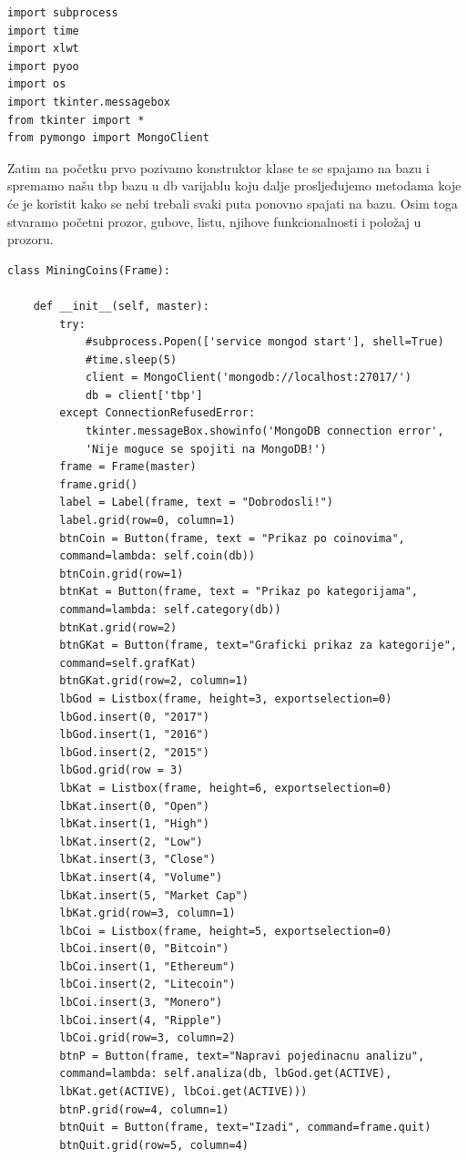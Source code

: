 \documentclass[a4paper,12pt]{foi}
\begin{document}
\lstset{commentstyle=\textit,language=python}
\begin{lstlisting}[frame=tb]
import subprocess
import time
import xlwt
import pyoo
import os
import tkinter.messagebox
from tkinter import *
from pymongo import MongoClient
\end{lstlisting}


Zatim na početku prvo pozivamo konstruktor klase te se spajamo na bazu i spremamo našu tbp bazu u db varijablu koju dalje prosljeđujemo metodama koje će je koristit kako se nebi trebali svaki puta ponovno spajati na bazu. Osim toga stvaramo početni prozor, gubove, listu, njihove funkcionalnosti i položaj u prozoru.
 
 
\lstset{commentstyle=\textit,language=python}
\begin{lstlisting}[frame=tb]
class MiningCoins(Frame):

    def __init__(self, master):
        try:
            #subprocess.Popen(['service mongod start'], shell=True)
            #time.sleep(5)
            client = MongoClient('mongodb://localhost:27017/')
            db = client['tbp']
        except ConnectionRefusedError:
            tkinter.messageBox.showinfo('MongoDB connection error', 
            'Nije moguce se spojiti na MongoDB!')
        frame = Frame(master)
        frame.grid()
        label = Label(frame, text = "Dobrodosli!")
        label.grid(row=0, column=1)
        btnCoin = Button(frame, text = "Prikaz po coinovima", 
        command=lambda: self.coin(db))
        btnCoin.grid(row=1)
        btnKat = Button(frame, text = "Prikaz po kategorijama", 
        command=lambda: self.category(db))
        btnKat.grid(row=2)
        btnGKat = Button(frame, text="Graficki prikaz za kategorije", 
        command=self.grafKat)
        btnGKat.grid(row=2, column=1)
        lbGod = Listbox(frame, height=3, exportselection=0)
        lbGod.insert(0, "2017")
        lbGod.insert(1, "2016")
        lbGod.insert(2, "2015")
        lbGod.grid(row = 3)
        lbKat = Listbox(frame, height=6, exportselection=0)
        lbKat.insert(0, "Open")
        lbKat.insert(1, "High")
        lbKat.insert(2, "Low")
        lbKat.insert(3, "Close")
        lbKat.insert(4, "Volume")
        lbKat.insert(5, "Market Cap")
        lbKat.grid(row=3, column=1)
        lbCoi = Listbox(frame, height=5, exportselection=0)
        lbCoi.insert(0, "Bitcoin")
        lbCoi.insert(1, "Ethereum")
        lbCoi.insert(2, "Litecoin")
        lbCoi.insert(3, "Monero")
        lbCoi.insert(4, "Ripple")
        lbCoi.grid(row=3, column=2)
        btnP = Button(frame, text="Napravi pojedinacnu analizu", 
        command=lambda: self.analiza(db, lbGod.get(ACTIVE), 
        lbKat.get(ACTIVE), lbCoi.get(ACTIVE)))
        btnP.grid(row=4, column=1)
        btnQuit = Button(frame, text="Izadi", command=frame.quit)
        btnQuit.grid(row=5, column=4)
\end{lstlisting}
\end{document}
